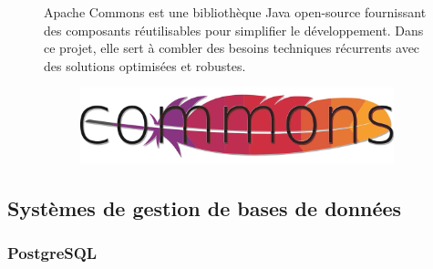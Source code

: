 \documentclass[12pt,a4paper]{report}
\begin{document}
	\begin{figure}[H]
		\begin{minipage}{0.8\textwidth}
			Apache Commons est une bibliothèque Java open-source fournissant des composants réutilisables pour simplifier le développement. Dans ce projet, elle sert à combler des besoins techniques récurrents avec des solutions optimisées et robustes.
		\end{minipage}
		\hfill
		\begin{minipage}{0.15\textwidth} 
			\begin{figure}[H]
				\centering
				\includegraphics[width=\linewidth]{apache-commons-logo.png}
				\label{fig:apache-commons-logo}
			\end{figure}
		\end{minipage}
	\end{figure}
	
	\subsection{Systèmes de gestion de bases de données}
	
	\subsubsection{PostgreSQL}
	
\end{document}
